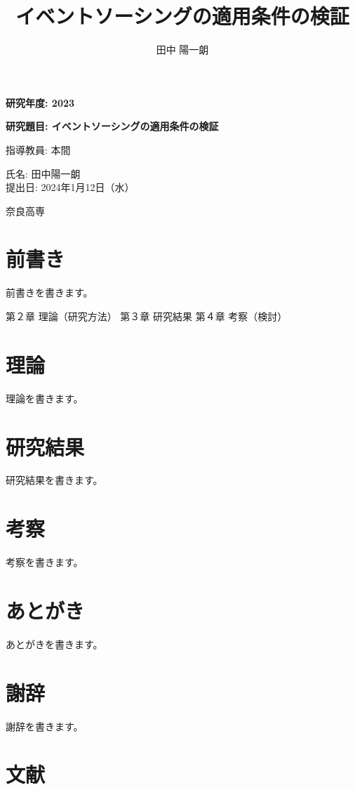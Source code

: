 \documentclass[dvipdfmx,uplatex,a4paper,10.5pt,oneside,onecolumn,openany]{jsbook}
\title{イベントソーシングの適用条件の検証}
\author{田中 陽一朗}
\begin{document}
    \begin{titlepage}
        \centering
        \vspace*{1cm}

        \Large
        \textbf{研究年度: 2023}

        \vspace{1.5cm}
        \huge
        \textbf{研究題目: イベントソーシングの適用条件の検証}

        \vspace{1.5cm}
        \Large
        指導教員: 本間

        \vfill

        \Large
        氏名: 田中陽一朗 \\
        提出日: 2024年1月12日（水）

        \vspace{1.5cm}
        \large
        奈良高専

        \vspace{1cm}
    \end{titlepage}
    
    \chapter{前書き}\label{ch:preface}

    前書きを書きます。

    \clearpage

    第２章 理論（研究方法）
    第３章 研究結果
    第４章 考察（検討）
    \chapter{理論}\label{ch:theory}

    理論を書きます。

    \clearpage

    \chapter{研究結果}\label{ch:result}

    研究結果を書きます。

    \clearpage

    \chapter{考察}\label{ch:consideration}

    考察を書きます。

    \clearpage

    \chapter{あとがき}\label{ch:conclusion}

    あとがきを書きます。

    \clearpage

    \chapter{謝辞}\label{ch:acknowledgement}

    謝辞を書きます。

    \clearpage

    \chapter{文献}\label{ch:reference}
\end{document}
